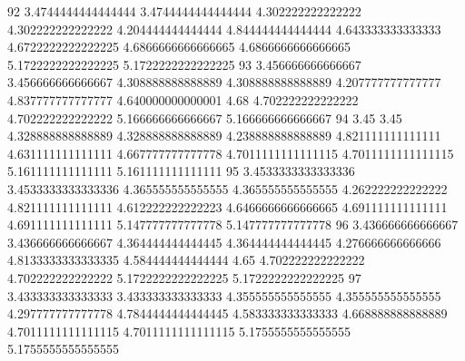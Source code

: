 92 3.4744444444444444 3.4744444444444444 4.302222222222222 4.302222222222222 4.204444444444444 4.844444444444444 4.643333333333333 4.6722222222222225 4.6866666666666665 4.6866666666666665 5.1722222222222225 5.1722222222222225
93 3.456666666666667 3.456666666666667 4.308888888888889 4.308888888888889 4.207777777777777 4.837777777777777 4.640000000000001 4.68 4.702222222222222 4.702222222222222 5.166666666666667 5.166666666666667
94 3.45 3.45 4.328888888888889 4.328888888888889 4.238888888888889 4.821111111111111 4.631111111111111 4.667777777777778 4.7011111111111115 4.7011111111111115 5.161111111111111 5.161111111111111
95 3.4533333333333336 3.4533333333333336 4.365555555555555 4.365555555555555 4.262222222222222 4.821111111111111 4.612222222222223 4.6466666666666665 4.691111111111111 4.691111111111111 5.147777777777778 5.147777777777778
96 3.436666666666667 3.436666666666667 4.364444444444445 4.364444444444445 4.276666666666666 4.8133333333333335 4.584444444444444 4.65 4.702222222222222 4.702222222222222 5.1722222222222225 5.1722222222222225
97 3.433333333333333 3.433333333333333 4.355555555555555 4.355555555555555 4.297777777777778 4.7844444444444445 4.583333333333333 4.668888888888889 4.7011111111111115 4.7011111111111115 5.1755555555555555 5.1755555555555555
